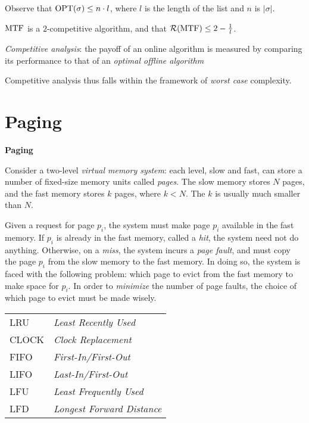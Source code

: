 \begin{frame}
Observe that $\mathrm{OPT}(\sigma)\le n\cdot l$, where $l$ is the length of
the list and $n$ is $|\sigma|$.

$\mathrm{MTF}$ is a $2$-competitive algorithm, and that $\mathcal{R}(\mathrm{MTF})\le
2-\frac{1}{l}$.

{\em Competitive analysis}: the payoff of an online algorithm is
measured by comparing its performance to that of an {\em optimal
offline algorithm}

Competitive analysis thus falls within the framework of {\em worst
case} complexity.
\end{frame}

\section{Paging}

\begin{frame}
{\bf Paging}

Consider a two-level {\em virtual memory system}:  each level, slow and fast, can store a number of fixed-size
memory units called {\em pages}.  The slow memory stores
$N$ pages, and the fast memory stores $k$ pages, where $k<N$.  The $k$
is usually much smaller than $N$.

Given a request for page $p_i$, the system must make page $p_i$
available in the fast memory.  If $p_i$ is already in the fast memory,
called a {\em hit}, the system need not do anything.
Otherwise, on a {\em miss}, the system incurs a {\em page
fault}, and must copy the page $p_i$ from the slow
memory to the fast memory.  In doing so, the system is faced with the
following problem: which page to evict from the fast memory to make
space for $p_i$.  In order to {\em minimize} the number of page
faults, the choice of which page to evict must be made wisely.
\end{frame}

\begin{frame}
\begin{center}
\begin{tabular}{ll}
LRU    &  {\em Least Recently Used}      \\
CLOCK  &  {\em Clock Replacement}        \\
FIFO   &  {\em First-In/First-Out}       \\
LIFO   &  {\em Last-In/First-Out}        \\
LFU    &  {\em Least Frequently Used}    \\\hline
LFD    &  {\em Longest Forward Distance} \\
\end{tabular}
\end{center}
\end{frame}

